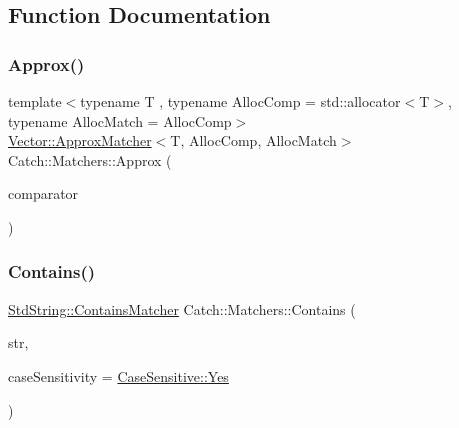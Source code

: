 \subsection{Function Documentation}
\mbox{\label{namespace_catch_1_1_matchers_ae706084b5987a683e0eecb79a18d7da9}} 
\subsubsection{\texorpdfstring{Approx()}{Approx()}}
{\footnotesize\ttfamily template$<$typename T , typename Alloc\+Comp  = std\+::allocator$<$\+T$>$, typename Alloc\+Match  = Alloc\+Comp$>$ \\
\mbox{\hyperlink{struct_catch_1_1_matchers_1_1_vector_1_1_approx_matcher}{Vector\+::\+Approx\+Matcher}}$<$T, Alloc\+Comp, Alloc\+Match$>$ Catch\+::\+Matchers\+::\+Approx (\begin{DoxyParamCaption}\item[{std\+::vector$<$ T, Alloc\+Comp $>$ const \&}]{comparator }\end{DoxyParamCaption})}

\mbox{\label{namespace_catch_1_1_matchers_a1f6c2accdc6cd75a84d7112dcad647b4}} 
\subsubsection{\texorpdfstring{Contains()}{Contains()}\hspace{0.1cm}{\footnotesize\ttfamily [1/2]}}
{\footnotesize\ttfamily \mbox{\hyperlink{struct_catch_1_1_matchers_1_1_std_string_1_1_contains_matcher}{Std\+String\+::\+Contains\+Matcher}} Catch\+::\+Matchers\+::\+Contains (\begin{DoxyParamCaption}\item[{std\+::string const \&}]{str,  }\item[{\mbox{\hyperlink{struct_catch_1_1_case_sensitive_aad49d3aee2d97066642fffa919685c6a}{Case\+Sensitive\+::\+Choice}}}]{case\+Sensitivity = {\ttfamily \mbox{\hyperlink{struct_catch_1_1_case_sensitive_aad49d3aee2d97066642fffa919685c6aa7c5550b69ec3c502e6f609b67f9613c6}{Case\+Sensitive\+::\+Yes}}} }\end{DoxyParamCaption})}

